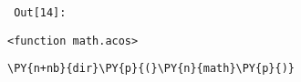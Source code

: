         {\par%
        \vspace{-1\smallerfontscale}%
        \noindent%
        \begin{minipage}{\cellleftmargin}%
    \hfill%
    {\smaller%
    \tt%
    \color{nbframe-out-prompt}%
    Out[14]:}%
    \hspace{\inputpadding}%
    \hspace{0em}%
    \hspace{3pt}%
    \end{minipage}%
        }%
    \begin{addmargin}[\cellleftmargin]{0em}%
    {\smaller%
    \vspace{-1\smallerfontscale}%
    
    
    
    \begin{verbatim}
<function math.acos>
    \end{verbatim}

    
}%
    \end{addmargin}%

{\par%
\vspace{-1\baselineskip}%
}%
\begin{notebookcell}[15]%
\begin{addmargin}[\cellleftmargin]{0em}%
{\smaller%
\par%
%
\vspace{-1\smallerfontscale}%
\begin{Verbatim}[commandchars=\\\{\}]
\PY{n+nb}{dir}\PY{p}{(}\PY{n}{math}\PY{p}{)}
\end{Verbatim}
%
\par%
\vspace{-1\smallerfontscale}}%
\end{addmargin}
\end{notebookcell}

\par\vspace{1\smallerfontscale}%
    
